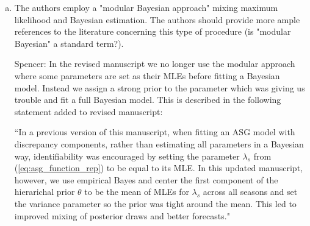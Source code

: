 \documentclass{article}
\newcommand{\spencer}[1]{{\color{blue} Spencer: #1}}
\begin{document}
\begin{enumerate}[1.]
\begin{enumerate}[a.]
% 

\item The authors employ a "modular Bayesian approach" mixing maximum likelihood and
Bayesian estimation. The authors should provide more ample references to the literature concerning
this type of procedure (is "modular Bayesian" a standard term?).

\spencer{In the revised manuscript we no longer use the modular approach
where some parameters are set as their MLEs before fitting a Bayesian 
model. Instead
we assign a strong prior to the parameter which was giving us trouble
and fit a full Bayesian model. This is
described in the following statement added to revised manuscript:

``In a previous version of this manuscript, when fitting an ASG model
with discrepancy components,
rather than estimating all parameters in a Bayesian way,
identifiability was encouraged by setting
the parameter $\lambda_s$ from (\ref{eq:asg_function_rep})
to be equal to its MLE. In this updated manuscript, 
however, we use empirical Bayes and center the first component of the 
hierarichal prior $\theta$ to be the mean of MLEs for $\lambda_s$ across
all seasons and set the variance parameter so the prior was tight around the
mean. This led to improved mixing of posterior draws and better forecasts."}


\end{enumerate}
\end{enumerate}
\end{document}
